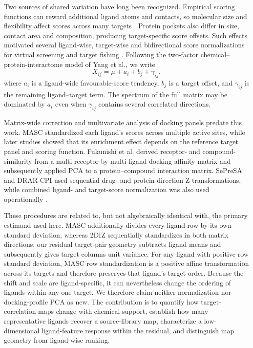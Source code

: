 \documentclass[11pt]{article}
\begin{document}
Two sources of shared variation have long been recognized. Empirical scoring functions can
reward additional ligand atoms and contacts, so molecular size and flexibility affect scores
across many targets \cite{pan2003,jacobsson2006,carta2007}. Protein pockets also differ in size, contact area and
composition, producing target-specific score offsets. Such effects motivated several
ligand-wise, target-wise and bidirectional score normalizations for virtual screening and
target fishing \cite{vigers2004,jacobsson2006,sepresa2009,yang2010cpi,luo2017,lapillo2019,lee2020crds}.
Following the two-factor chemical--protein-interactome model of Yang et al., we write
\begin{equation}
X_{ij}=\mu+a_i+b_j+\gamma_{ij},
\label{eq:additive}
\end{equation}
where $a_i$ is a ligand-wide favourable-score tendency, $b_j$ is a target offset, and
$\gamma_{ij}$ is the remaining ligand--target term. The spectrum of the full matrix may be
dominated by $a_i$ even when $\gamma_{ij}$ contains several correlated directions.

Matrix-wide correction and multivariate analysis of docking panels predate this work. MASC
standardized each ligand's scores across multiple active sites, while later studies showed
that its enrichment effect depends on the reference target panel and scoring function.
Fukunishi et al. derived receptor- and compound-similarity from a multi-receptor by
multi-ligand docking-affinity matrix and subsequently applied PCA to a protein--compound
interaction matrix. SePreSA and DRAR-CPI used sequential drug- and protein-direction Z
transformations, while combined ligand- and target-score normalization was also used
operationally \cite{vigers2004,fukunishi2005,fukunishi2006mts,fukunishi2006,sepresa2009,
yang2010cpi,drarcpi2011,jacobsson2006,casey2009,fukunishi2018}.

These procedures are related to, but not algebraically identical with, the primary estimand
used here. MASC additionally divides every ligand row by its own standard deviation, whereas
2DIZ sequentially standardizes in both matrix directions; our residual target-pair geometry
subtracts ligand means and subsequently gives target columns unit variance. For any ligand
with positive row standard deviation, MASC row standardization is a positive affine
transformation across its targets and therefore preserves that ligand's target order. Because
the shift and scale are ligand-specific, it can nevertheless change the ordering of ligands
within any one target. We therefore
claim neither normalization nor docking-profile PCA as new. The contribution is to quantify
how target-correlation maps change with chemical support, establish how many representative
ligands recover a source-library map, characterize a low-dimensional ligand-feature response
within the residual, and distinguish map geometry from ligand-wise ranking.
\end{document}
